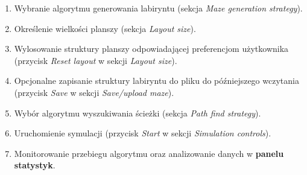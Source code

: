 \documentclass[../doc.tex]{subfiles}
\begin{document}
    \begin{enumerate}
        
        \item Wybranie algorytmu generowania labiryntu (sekcja \textit{Maze generation strategy}).
        
        \item Określenie wielkości planszy (sekcja \textit{Layout size}).
        
        \item Wylosowanie struktury planszy odpowiadającej preferencjom użytkownika (przycisk \textit{Reset layout} w sekcji \textit{Layout size}).
        
        \item Opcjonalne zapisanie struktury labiryntu do pliku do późniejszego wczytania (przycisk \textit{Save} w sekcji \textit{Save/upload maze}).
        
        \item Wybór algorytmu wyszukiwania ścieżki (sekcja \textit{Path find strategy}).
        
        \item Uruchomienie symulacji (przycisk \textit{Start} w sekcji \textit{Simulation controls}).
        
        \item Monitorowanie przebiegu algorytmu oraz analizowanie danych w \textbf{panelu statystyk}.
    \end{enumerate}
\end{document}
